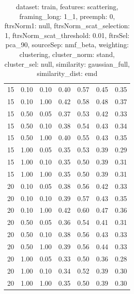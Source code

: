 \documentclass[12pt,a4paper,fleqn]{tufte-handout}
\begin{document}
\begin{table}
\begin{center}
\begin{tabular}{lllcccc}
15 & 0.10 & 0.10 & 0.40 & 0.57 & 0.45 & 0.35 \\                      
15 & 0.10 & 1.00 & 0.42 & 0.58 & 0.48 & 0.37 \\                      
15 & 0.50 & 0.05 & 0.37 & 0.53 & 0.42 & 0.33 \\                      
15 & 0.50 & 0.10 & 0.38 & 0.54 & 0.43 & 0.34 \\                      
15 & 0.50 & 1.00 & 0.40 & 0.55 & 0.43 & 0.35 \\                      
15 & 1.00 & 0.05 & 0.35 & 0.53 & 0.39 & 0.29 \\                      
15 & 1.00 & 0.10 & 0.35 & 0.50 & 0.39 & 0.31 \\                      
15 & 1.00 & 1.00 & 0.35 & 0.50 & 0.39 & 0.31 \\                      
20 & 0.10 & 0.05 & 0.38 & 0.56 & 0.42 & 0.33 \\                      
20 & 0.10 & 0.10 & 0.39 & 0.57 & 0.43 & 0.35 \\                      
20 & 0.10 & 1.00 & 0.42 & 0.60 & 0.47 & 0.36 \\                      
20 & 0.50 & 0.05 & 0.36 & 0.54 & 0.41 & 0.31 \\                      
20 & 0.50 & 0.10 & 0.38 & 0.56 & 0.43 & 0.33 \\                      
20 & 0.50 & 1.00 & 0.39 & 0.56 & 0.44 & 0.33 \\                      
20 & 1.00 & 0.05 & 0.33 & 0.50 & 0.36 & 0.28 \\                      
20 & 1.00 & 0.10 & 0.34 & 0.52 & 0.39 & 0.30 \\                      
20 & 1.00 & 1.00 & 0.35 & 0.50 & 0.39 & 0.30 \\                      
\end{tabular}                      
\end{center}                      
\caption{dataset: train, features: scattering, framing\_long: 1\_1, preemph: 0, ftrsNorm1: null, ftrsNorm\_scat\_selection: 1, ftrsNorm\_scat\_threshold: 0.01, ftrsSel: pca\_90, sourceSep: nmf\_beta, weighting: clustering, cluster\_norm: stand, cluster\_sel: null, similarity: gaussian\_full, similarity\_dist: emd}                      
\label{datasetrFeaturscFraminlong1_1Preemp0Ftrsnorm1nuFtrsnoscatselect1Ftrsnoscatthresh0.01Ftrsselpc90SourcesepnmbeWeightclClustenormstClusteselnuSimilagafuSimiladistem}                      
\end{table}                      
 
\end{document}
